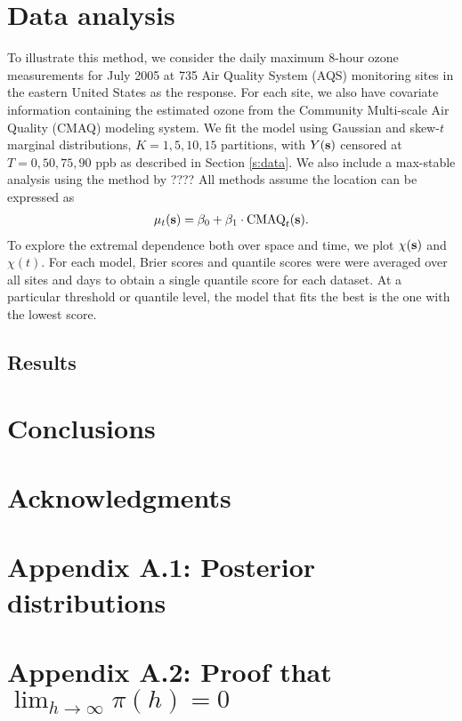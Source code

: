 \documentclass[11pt]{article}
\begin{document}
\section{Data analysis}\label{s:analysis}
To illustrate this method, we consider the daily maximum 8-hour ozone measurements for July 2005 at 735 Air Quality System (AQS) monitoring sites in the eastern United States as the response.
For each site, we also have covariate information containing the estimated ozone from the Community Multi-scale Air Quality (CMAQ) modeling system.
We fit the model using Gaussian and skew-$t$ marginal distributions, $K=1, 5, 10, 15$ partitions, with $Y(\mbox{\bf s})$ censored at $T = 0, 50, 75, 90$ ppb as described in Section \ref{s:data}.
We also include a max-stable analysis using the method by ????
All methods assume the location can be expressed as
\begin{align}
  \mu_t(\mbox{\bf s}) = \beta_0 + \beta_1 \cdot \text{CMAQ}_t(\mbox{\bf s}).
\end{align}
To explore the extremal dependence both over space and time, we plot $\chi(\mbox{\bf s})$ and $\chi(t)$.
For each model, Brier scores and quantile scores were were averaged over all sites and days to obtain a single quantile score for each dataset.
At a particular threshold or quantile level, the model that fits the best is the one with the lowest score.

\subsection{Results}\label{s:results}

\section{Conclusions}\label{s:con}

\section*{Acknowledgments}

\section*{Appendix A.1: Posterior distributions}





\section*{Appendix A.2: Proof that $\lim_{h \rightarrow \infty} \pi(h) = 0$}

\end{document}
